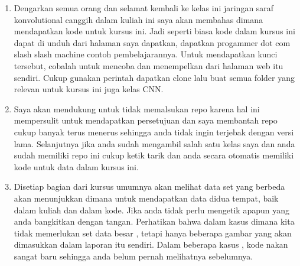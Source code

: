 \begin{enumerate}
\item Dengarkan semua orang dan selamat kembali ke kelas ini jaringan saraf konvolutional canggih dalam kuliah ini saya akan membahas dimana mendapatkan kode untuk kursus ini. Jadi seperti biasa kode dalam kursus ini dapat di unduh dari halaman saya dapatkan, dapatkan progammer dot com slash slash machine contoh pembelajarannya. Untuk mendapatkan kunci tersebut, cobalah untuk mencoba dan menempelkan dari halaman web itu sendiri. Cukup gunakan perintah dapatkan clone lalu buat semua folder yang relevan untuk kursus ini juga kelas CNN.
\item Saya akan mendukung untuk tidak memalsukan repo karena hal ini mempersulit untuk mendapatkan persetujuan dan saya membantah repo cukup banyak terus menerus sehingga anda tidak ingin terjebak dengan versi lama. Selanjutnya jika anda sudah mengambil salah satu kelas saya dan anda sudah memiliki repo ini cukup ketik tarik dan anda secara otomatis memiliki kode untuk data dalam kursus ini.
\item Disetiap bagian dari kursus umumnya akan melihat data set yang berbeda akan menunjukkan dimana untuk mendapatkan data didua tempat, baik dalam kuliah dan dalam kode. Jika anda tidak perlu mengetik apapun yang anda bangkitkan dengan tangan. Perhatikan bahwa dalam kasus dimana kita tidak memerlukan set data besar , tetapi hanya beberapa gambar yang akan dimasukkan dalam laporan itu sendiri. Dalam beberapa kasus , kode nakan sangat baru sehingga anda belum pernah melihatnya sebelumnya.
\end{enumerate}